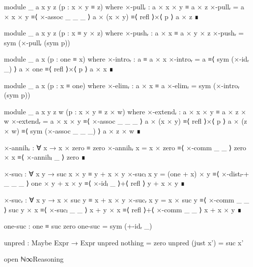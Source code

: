 \begin{code}[hide]
    module _ {a x y z} (p : x × y ≡ z) where
      ×-pullᵣ : a × x × y ≡ a × z
      ×-pullᵣ =
        a × x × y   ≡⟨ ×-assoc _ _ _ ⟩
        a × (x × y) ≡⟨ refl ⟩×⟨ p ⟩
        a × z       ∎

    module _ {a x y z} (p : x ≡ y × z) where
      ×-pushᵣ : a × x ≡ a × y × z
      ×-pushᵣ = sym (×-pullᵣ (sym p))

    module _ {a x} (p : one ≡ x) where
      ×-introᵣ : a ≡ a × x
      ×-introᵣ =
        a       ≡⟨ sym (×-idᵣ _) ⟩
        a × one ≡⟨ refl ⟩×⟨ p ⟩
        a × x   ∎

    module _ {a x} (p : x ≡ one) where
      ×-elimᵣ : a × x ≡ a
      ×-elimᵣ = sym (×-introᵣ (sym p))

    module _ {a x y z w} (p : x × y ≡ z × w) where
      ×-extendᵣ : a × x × y ≡ a × z × w
      ×-extendᵣ =
        a × x × y   ≡⟨ ×-assoc _ _ _ ⟩
        a × (x × y) ≡⟨ refl ⟩×⟨ p ⟩
        a × (z × w) ≡⟨ sym (×-assoc _ _ _) ⟩
        a × z × w   ∎

    ×-annihᵣ : ∀ x → x × zero ≡ zero
    ×-annihᵣ x =
      x × zero ≡⟨ ×-comm _ _ ⟩
      zero × x ≡⟨ ×-annihₗ _ ⟩
      zero     ∎

    ×-sucₗ : ∀ x y → suc x × y ≡ y + x × y
    ×-sucₗ x y =
      (one + x) × y   ≡⟨ ×-distₗ-+ _ _ _ ⟩
      one × y + x × y ≡⟨ ×-idₗ _ ⟩+⟨ refl ⟩
      y + x × y       ∎

    ×-sucᵣ : ∀ x y → x × suc y ≡ x + x × y
    ×-sucᵣ x y =
      x × suc y ≡⟨ ×-comm _ _ ⟩
      suc y × x ≡⟨ ×-sucₗ _ _ ⟩
      x + y × x ≡⟨ refl ⟩+⟨ ×-comm _ _ ⟩
      x + x × y ∎

    one-suc : one ≡ suc zero
    one-suc = sym (+-idᵣ _)

    unpred : Maybe Expr → Expr
    unpred nothing = zero
    unpred (just x') = suc x'

  open ℕ∞Reasoning
\end{code}


